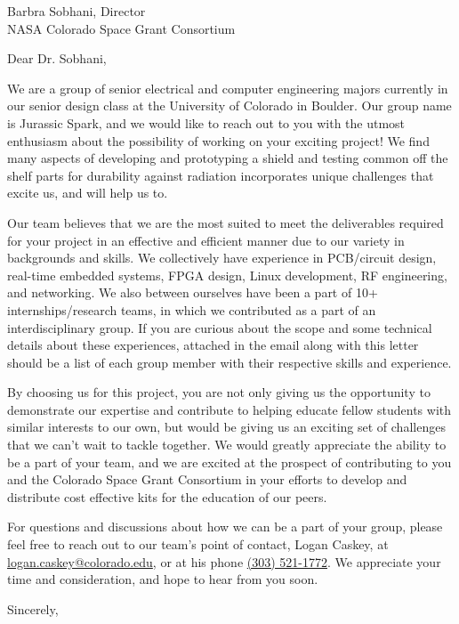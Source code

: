 \documentclass{letter}
\begin{document}
\begin{letter}
{Barbra Sobhani, Director\\
NASA Colorado Space Grant Consortium
}

\opening{Dear Dr. Sobhani,}

We are a group of senior electrical and computer engineering majors currently in our senior design class at the University of Colorado in Boulder. Our group name is Jurassic Spark, and we would like to reach out to you with the utmost enthusiasm about the possibility of working on your exciting project! We find many aspects of developing and prototyping a shield and testing common off the shelf parts for durability against radiation incorporates unique challenges that excite us, and will help us to.

Our team believes that we are the most suited to meet the deliverables required for your project in an effective and efficient manner due to our variety in backgrounds and skills. We collectively have experience in PCB/circuit design, real-time embedded systems, FPGA design, Linux development, RF engineering, and networking. We also between ourselves have been a part of 10+ internships/research teams, in which we contributed as a part of an interdisciplinary group. If you are curious about the scope and some technical details about these experiences, attached in the email along with this letter should be a list of each group member with their respective skills and experience. 

By choosing us for this project, you are not only giving us the opportunity to demonstrate our expertise and contribute to helping educate fellow students with similar interests to our own, but would be giving us an exciting set of challenges that we can't wait to tackle together. We would greatly appreciate the ability to be a part of your team, and we are excited at the prospect of contributing to you and the Colorado Space Grant Consortium in your efforts to develop and distribute cost effective kits for the education of our peers. 

For questions and discussions about how we can be a part of your group, please feel free to reach out to our team's point of contact, Logan Caskey, at \href{mailto:logan.caskey@colorado.edu}{logan.caskey@colorado.edu}, or at his phone \href{tel:+13035211772}{(303) 521-1772}. We appreciate your time and consideration, and hope to hear from you soon.

\vspace{1em}

\closing{Sincerely,}

\end{letter}
\end{document}
